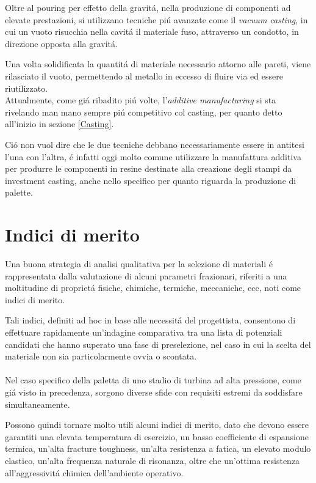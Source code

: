 \documentclass{article}
\begin{document}
        Oltre al pouring per effetto della gravitá, nella 
        produzione di componenti ad 
        elevate prestazioni, si utilizzano tecniche piú avanzate come il 
        \textit{vacuum casting}, in cui un vuoto risucchia nella cavitá
        il materiale fuso, attraverso un condotto, in direzione opposta alla gravitá. 

        Una volta solidificata la quantitá di materiale necessario attorno alle pareti,
        viene rilasciato il vuoto, permettendo al metallo in eccesso di fluire via ed essere riutilizzato. \\ 


        Attualmente, come giá ribadito piú volte, l'\textit{additive manufacturing} si sta rivelando
        man mano sempre piú competitivo col casting, per quanto detto all'inizio in sezione \ref{Casting}. 

        Ció non vuol dire che le due tecniche debbano necessariamente essere in antitesi l'una con l'altra, é 
        infatti oggi molto comune utilizzare la manufattura additiva per produrre le componenti in resine 
        destinate alla creazione degli stampi da investment casting, anche nello specifico per quanto riguarda la produzione
        di palette. 


        \clearpage


    \section{Indici di merito\label{material_index}}


        Una buona strategia di analisi qualitativa per la selezione di materiali é rappresentata dalla valutazione di alcuni parametri frazionari, riferiti a una moltitudine di proprietá fisiche, chimiche, termiche, meccaniche, ecc, noti come indici di merito.
        
        Tali indici, definiti ad hoc in base alle necessitá del progettista, consentono di effettuare rapidamente un’indagine comparativa tra una lista di potenziali candidati che hanno superato una fase di preselezione, nel caso in cui la scelta del materiale non sia particolarmente ovvia o scontata. 
        \\ \\
        Nel caso specifico della paletta di uno stadio di turbina ad alta pressione, come giá visto in precedenza, sorgono diverse sfide con requisiti estremi da soddisfare simultaneamente.

        Possono quindi tornare molto utili alcuni indici di merito, dato che devono essere garantiti una elevata temperatura di esercizio, un basso coefficiente di espansione termica, un’alta fracture toughness, un’alta resistenza a fatica, un elevato modulo elastico, un’alta frequenza naturale di risonanza, oltre che un’ottima resistenza all’aggressivitá chimica dell’ambiente operativo. 
        
\end{document}
